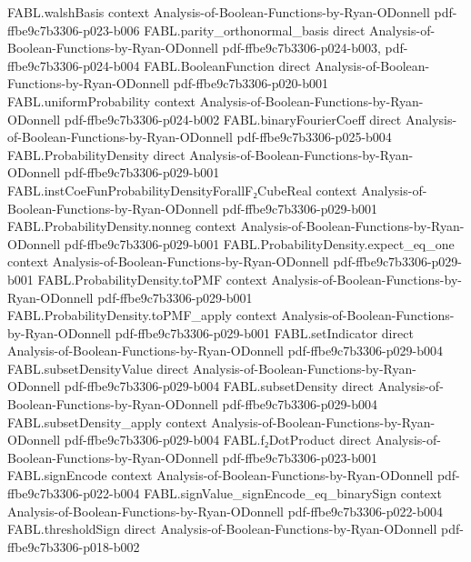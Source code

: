 \begin{theorem}
\proofstep
  {FABL.walshBasis}
  {context}
  {Analysis-of-Boolean-Functions-by-Ryan-ODonnell}
  {pdf-ffbe9c7b3306-p023-b006}
\proofstep
  {FABL.parity_orthonormal_basis}
  {direct}
  {Analysis-of-Boolean-Functions-by-Ryan-ODonnell}
  {pdf-ffbe9c7b3306-p024-b003,
    pdf-ffbe9c7b3306-p024-b004}
\proofstep
  {FABL.BooleanFunction}
  {direct}
  {Analysis-of-Boolean-Functions-by-Ryan-ODonnell}
  {pdf-ffbe9c7b3306-p020-b001}
\proofstep
  {FABL.uniformProbability}
  {context}
  {Analysis-of-Boolean-Functions-by-Ryan-ODonnell}
  {pdf-ffbe9c7b3306-p024-b002}
\proofstep
  {FABL.binaryFourierCoeff}
  {direct}
  {Analysis-of-Boolean-Functions-by-Ryan-ODonnell}
  {pdf-ffbe9c7b3306-p025-b004}
\proofstep
  {FABL.ProbabilityDensity}
  {direct}
  {Analysis-of-Boolean-Functions-by-Ryan-ODonnell}
  {pdf-ffbe9c7b3306-p029-b001}
\proofstep
  {FABL.instCoeFunProbabilityDensityForallF₂CubeReal}
  {context}
  {Analysis-of-Boolean-Functions-by-Ryan-ODonnell}
  {pdf-ffbe9c7b3306-p029-b001}
\proofstep
  {FABL.ProbabilityDensity.nonneg}
  {context}
  {Analysis-of-Boolean-Functions-by-Ryan-ODonnell}
  {pdf-ffbe9c7b3306-p029-b001}
\proofstep
  {FABL.ProbabilityDensity.expect_eq_one}
  {context}
  {Analysis-of-Boolean-Functions-by-Ryan-ODonnell}
  {pdf-ffbe9c7b3306-p029-b001}
\proofstep
  {FABL.ProbabilityDensity.toPMF}
  {context}
  {Analysis-of-Boolean-Functions-by-Ryan-ODonnell}
  {pdf-ffbe9c7b3306-p029-b001}
\proofstep
  {FABL.ProbabilityDensity.toPMF_apply}
  {context}
  {Analysis-of-Boolean-Functions-by-Ryan-ODonnell}
  {pdf-ffbe9c7b3306-p029-b001}
\proofstep
  {FABL.setIndicator}
  {direct}
  {Analysis-of-Boolean-Functions-by-Ryan-ODonnell}
  {pdf-ffbe9c7b3306-p029-b004}
\proofstep
  {FABL.subsetDensityValue}
  {direct}
  {Analysis-of-Boolean-Functions-by-Ryan-ODonnell}
  {pdf-ffbe9c7b3306-p029-b004}
\proofstep
  {FABL.subsetDensity}
  {direct}
  {Analysis-of-Boolean-Functions-by-Ryan-ODonnell}
  {pdf-ffbe9c7b3306-p029-b004}
\proofstep
  {FABL.subsetDensity_apply}
  {context}
  {Analysis-of-Boolean-Functions-by-Ryan-ODonnell}
  {pdf-ffbe9c7b3306-p029-b004}
\proofstep
  {FABL.f₂DotProduct}
  {direct}
  {Analysis-of-Boolean-Functions-by-Ryan-ODonnell}
  {pdf-ffbe9c7b3306-p023-b001}
\proofstep
  {FABL.signEncode}
  {context}
  {Analysis-of-Boolean-Functions-by-Ryan-ODonnell}
  {pdf-ffbe9c7b3306-p022-b004}
\proofstep
  {FABL.signValue_signEncode_eq_binarySign}
  {context}
  {Analysis-of-Boolean-Functions-by-Ryan-ODonnell}
  {pdf-ffbe9c7b3306-p022-b004}
\proofstep
  {FABL.thresholdSign}
  {direct}
  {Analysis-of-Boolean-Functions-by-Ryan-ODonnell}
  {pdf-ffbe9c7b3306-p018-b002}
\proofstep

\end{theorem}
